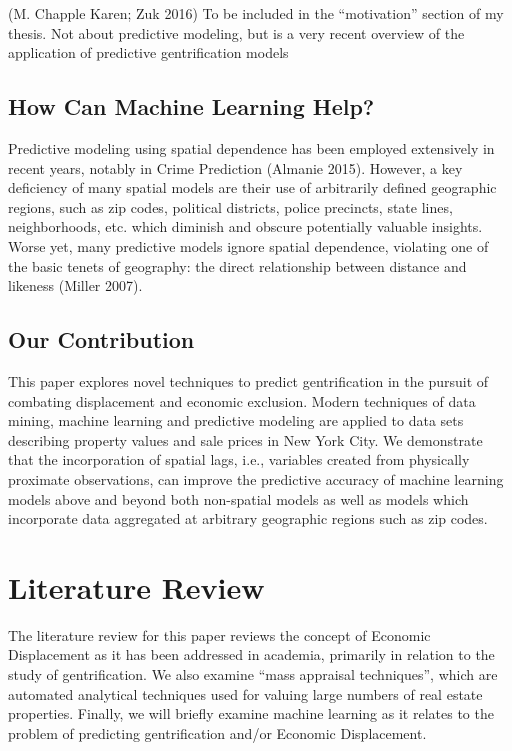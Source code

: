 \documentclass[]{article}
\begin{document}
(M. Chapple Karen; Zuk 2016) To be included in the ``motivation''
section of my thesis. Not about predictive modeling, but is a very
recent overview of the application of predictive gentrification models

\subsection{How Can Machine Learning
Help?}\label{how-can-machine-learning-help}

Predictive modeling using spatial dependence has been employed
extensively in recent years, notably in Crime Prediction (Almanie 2015).
However, a key deficiency of many spatial models are their use of
arbitrarily defined geographic regions, such as zip codes, political
districts, police precincts, state lines, neighborhoods, etc. which
diminish and obscure potentially valuable insights. Worse yet, many
predictive models ignore spatial dependence, violating one of the basic
tenets of geography: the direct relationship between distance and
likeness (Miller 2007).

\subsection{Our Contribution}\label{our-contribution}

This paper explores novel techniques to predict gentrification in the
pursuit of combating displacement and economic exclusion. Modern
techniques of data mining, machine learning and predictive modeling are
applied to data sets describing property values and sale prices in New
York City. We demonstrate that the incorporation of spatial lags, i.e.,
variables created from physically proximate observations, can improve
the predictive accuracy of machine learning models above and beyond both
non-spatial models as well as models which incorporate data aggregated
at arbitrary geographic regions such as zip codes.

\section{Literature Review}\label{literature-review}

The literature review for this paper reviews the concept of Economic
Displacement as it has been addressed in academia, primarily in relation
to the study of gentrification. We also examine ``mass appraisal
techniques'', which are automated analytical techniques used for valuing
large numbers of real estate properties. Finally, we will briefly
examine machine learning as it relates to the problem of predicting
gentrification and/or Economic Displacement.
\end{document}

